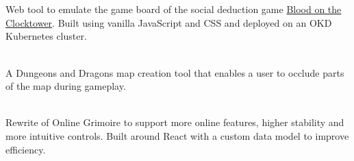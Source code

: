 \documentclass[10pt,a4paper,ragged2e,withhyper]{altacv}
\begin{document}

\\\smallskip
{}


 \\\smallskip
Web tool to emulate the game board of the social deduction game \href{https://bloodontheclocktower.com/}{Blood on the Clocktower}\@. Built using vanilla JavaScript and CSS and deployed on an OKD Kubernetes cluster\@.

\divider{}

 \\\smallskip
A Dungeons and Dragons map creation tool that enables a user to occlude parts of the map during gameplay\@.%

\divider{}

 \\\smallskip
Rewrite of Online Grimoire to support more online features, 
higher stability and more intuitive controls\@. Built around
React with a custom data model to improve efficiency\@.






\end{document}
